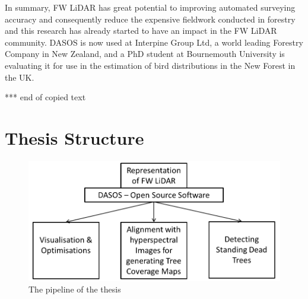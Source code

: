 \documentclass{subfiles}
\begin{document}
\par In summary, FW LiDAR has great potential to improving automated surveying accuracy and consequently reduce the expensive fieldwork conducted in forestry and this research has already started to have an impact in the FW LiDAR community. DASOS is now used at Interpine Group Ltd, a world leading Forestry Company in New Zealand, and a PhD student at Bournemouth University is evaluating it for use in the estimation of bird distributions in the New Forest in the UK.

	
	\par {\color{red} *** end of copied text}
	


\section{Thesis Structure}

\begin{figure}[!htbp]
	\includegraphics[width=\textwidth]{img/Pipeline}
	\caption{The pipeline of the thesis}
\end{figure}
\end{document}
